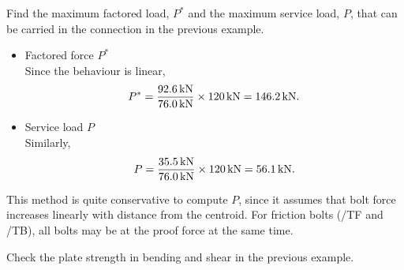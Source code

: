 \begin{exmp}
Find the maximum factored load, $P^*$ and the maximum service load, $P$, that can be carried in the connection in the previous example.
\end{exmp}
\begin{solution}
\begin{itemize}
\item Factored force $P^*$\\Since the behaviour is linear,
\begin{gather*}
P^*=\dfrac{\SI{92.6}{\kilo\newton}}{\SI{76.0}{\kilo\newton}}\times\SI{120}{\kilo\newton}=\SI{146.2}{\kilo\newton}.
\end{gather*}
\item Service load $P$\\Similarly,
\begin{gather*}
P=\dfrac{\SI{35.5}{\kilo\newton}}{\SI{76.0}{\kilo\newton}}\times\SI{120}{\kilo\newton}=\SI{56.1}{\kilo\newton}.
\end{gather*}
\end{itemize}
This method is quite conservative to compute $P$, since it assumes that bolt force increases linearly with distance from the centroid. For friction bolts (/TF and /TB), all bolts may be at the proof force at the same time.
\end{solution}
\begin{exmp}
Check the plate strength in bending and shear in the previous example.
\end{exmp}
